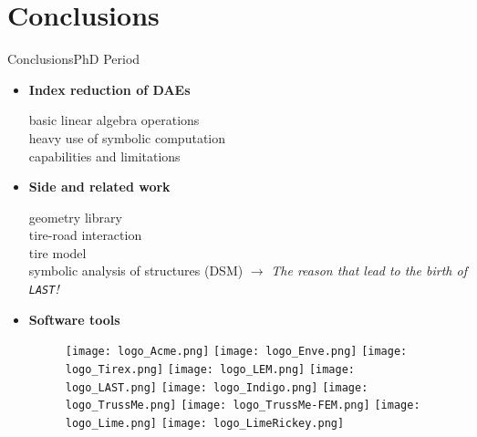 
\section{Conclusions}

\begin{frame}{Conclusions}{PhD Period}
  \begin{itemize}
    \item \textbf{Index reduction of \acsp{DAE}} \\
    \begin{small}
      \qquad basic linear algebra operations \\
      \qquad heavy use of symbolic computation \\
      \qquad capabilities and limitations
    \end{small}
    \item \textbf{Side and related work} \\
    \begin{small}
      \qquad geometry library \\
      \qquad tire-road interaction \\
      \qquad tire model \\
      \qquad symbolic analysis of structures (\acs{DSM}) $\rightarrow$ \emph{The reason that lead to the birth of \texttt{LAST}!}
    \end{small}
    \item \textbf{Software tools} \\[0.2em]
    \begin{figure}
      \centering
      \texttt{[image: logo\_Acme.png]}%
      \texttt{[image: logo\_Enve.png]}%
      \texttt{[image: logo\_Tirex.png]}%
      \texttt{[image: logo\_LEM.png]}%
      \texttt{[image: logo\_LAST.png]}%
      \texttt{[image: logo\_Indigo.png]}%
      \texttt{[image: logo\_TrussMe.png]}%
      \texttt{[image: logo\_TrussMe-FEM.png]}%
      \texttt{[image: logo\_Lime.png]}%
      \texttt{[image: logo\_LimeRickey.png]}
    \end{figure}
  \end{itemize}
\end{frame}

